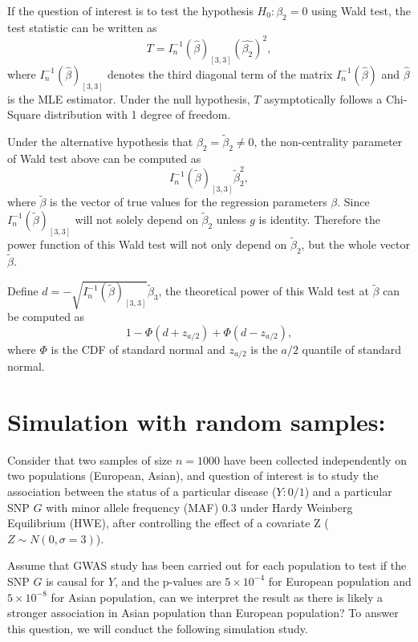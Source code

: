 \documentclass[
]{article}
\begin{document}
If the question of interest is to test the hypothesis \(H_0: \beta_2=0\)
using Wald test, the test statistic can be written as
\[T = I_n^{-1}(\hat{\beta})_{[3,3]}(\hat{\beta_2})^2,\] where
\(I_n^{-1}(\hat{\beta})_{[3,3]}\) denotes the third diagonal term of the
matrix \(I_n^{-1}(\hat{\beta})\) and \(\hat{\beta}\) is the MLE
estimator. Under the null hypothesis, \(T\) asymptotically follows a
Chi-Square distribution with 1 degree of freedom.

Under the alternative hypothesis that
\(\beta_2 = \tilde{\beta}_2 \neq 0\), the non-centrality parameter of
Wald test above can be computed as
\[I_n^{-1}(\tilde{\beta})_{[3,3]}\tilde{\beta}_2^2,\] where
\(\tilde{\beta}\) is the vector of true values for the regression
parameters \(\beta\). Since \(I_n^{-1}(\tilde{\beta})_{[3,3]}\) will not
solely depend on \(\tilde{\beta}_2\) unless \(g\) is identity. Therefore
the power function of this Wald test will not only depend on
\(\tilde{\beta}_2\), but the whole vector \(\tilde{\beta}\).

Define \(d=-\sqrt{I_n^{-1}(\tilde{\beta})_{[3,3]}}\tilde{\beta}_3\), the
theoretical power of this Wald test at \(\tilde{\beta}\) can be computed
as \[1-\Phi(d+z_{a/2})+\Phi(d-z_{a/2}),\] where \(\Phi\) is the CDF of
standard normal and \(z_{a/2}\) is the \(a/2\) quantile of standard
normal.

\hypertarget{simulation-with-random-samples}{%
\section{Simulation with random
samples:}\label{simulation-with-random-samples}}

Consider that two samples of size \(n=1000\) have been collected
independently on two populations (European, Asian), and question of
interest is to study the association between the status of a particular
disease (\(Y:0/1\)) and a particular SNP \(G\) with minor allele
frequency (MAF) \(0.3\) under Hardy Weinberg Equilibrium (HWE), after
controlling the effect of a covariate Z (\(Z\sim N(0,\sigma=3)\)).

Assume that GWAS study has been carried out for each population to test
if the SNP \(G\) is causal for \(Y\), and the p-values are
\(5\times10^{-4}\) for European population and \(5 \times 10^{-8}\) for
Asian population, can we interpret the result as there is likely a
stronger association in Asian population than European population? To
answer this question, we will conduct the following simulation study.
\end{document}
